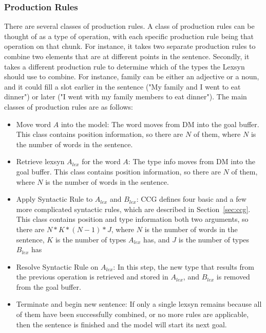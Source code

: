 \subsubsection{Production Rules}\label{sec:rules}
There are several classes of production rules. A class of production rules can be thought of as a type of operation, with each specific production rule being that operation on that chunk. For instance, it takes two separate production rules to combine two elements that are at different points in the sentence. Secondly, it takes a different production rule to determine which of the types the Lexsyn should use to combine. For instance, family can be either an adjective or a noun, and it could fill a slot earlier in the sentence ("My family and I went to eat dinner") or later ("I went with my family members to eat dinner"). The main classes of production rules are as follows:
\begin{itemize}
\item Move word $A$ into the model: The word moves from DM into the goal buffer. This class contains position information, so there are $N$ of them, where $N$ is the number of words in the sentence.
\item Retrieve lexsyn $A_{lex}$ for the word $A$: The type info moves from DM into the goal buffer. This class contains position information, so there are $N$ of them, where $N$ is the number of words in the sentence.
\item Apply Syntactic Rule to $A_{lex}$ and $B_{lex}$: CCG defines four basic and a few more complicated syntactic rules, which are described in Section~\ref{sec:ccg}. This class contains position and type information both two arguments, so there are $N * K * (N-1) * J$, where $N$ is the number of words in the sentence, $K$ is the number of types $A_{lex}$ has, and $J$ is the number of types $B_{lex}$ has
\item Resolve Syntactic Rule on $A_{lex}$: In this step, the new type that results from the previous operation is retrieved and stored in $A_{lex}$, and $B_{lex}$ is removed from the goal buffer.
\item Terminate and begin new sentence: If only a single lexsyn remains because all of them have been successfully combined, or no more rules are applicable, then the sentence is finished and the model will start its next goal. 
\end{itemize}


